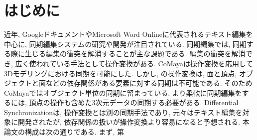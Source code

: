 \chapter{はじめに}
近年, GoogleドキュメントやMicrosoft Word Onlineに代表されるテキスト編集を中心に, 同期編集システムの研究や開発が注目されている.
同期編集では, 同期する際に生じる編集の衝突を解消することが主な課題である.
編集の衝突を解消でき, 広く使われている手法として操作変換がある.
CoMaya\cite{COMAYA}は操作変換を応用して3Dモデリングにおける同期を可能にした.
しかし, \cite{COMAYA}の操作変換は, 面と頂点, オブジェクトと面などの依存関係がある要素に対する同期は不可能である.
そのためCoMayaではオブジェクト単位の同期に留まっている.
より柔軟に同期編集をするには, 頂点の操作も含めた3次元データの同期する必要がある.
Differential Synchronization\cite{DS}は, 操作変換とは別の同期手法であり, 元々はテキスト編集を対象に開発されたが, 依存関係の扱いが操作変換より容易になると予想される.
本論文の構成は次の通りである.
まず, 第
